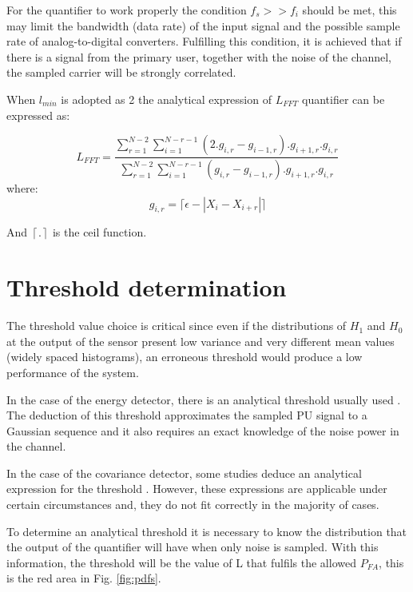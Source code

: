 \documentclass[lettersize,journal]{IEEEtran}
\begin{document}
For the quantifier to work properly the condition $f_s>>f_i$ should be met, this may limit the bandwidth (data rate) of the input signal and the possible sample rate of analog-to-digital converters. Fulfilling this condition, it is achieved that if there is a signal from the primary user, together with the noise of the channel, the sampled carrier will be strongly correlated.

When $l_{min}$ is adopted as 2 the analytical expression of $L_{FFT}$ quantifier can be expressed as:

\begin{equation}
    \label{expresion_L}
    L_{FFT}=\frac{
\sum_{r=1} ^{N-2} \sum_{i=1} ^{N-r-1}  (2.g_{i,r}-g_{i-1,r}).g_{i+1,r}.g_{i,r}}{
\sum_{r=1} ^{N-2} \sum_{i=1} ^{N-r-1}  (g_{i,r}-g_{i-1,r}).g_{i+1,r}.g_{i,r}}
\end{equation}
where:
\begin{equation}
    \label{expresion_g}
    g_{i,r}=\lceil \epsilon- | X_{i}-X_{i+r}| \rceil
\end{equation}

And $\left\lceil . \right\rceil$ is the ceil function.

\section{Threshold determination}\label{umbral}
The threshold value choice is critical since even if the distributions of $H_1$ and $H_0$ at the output of the sensor present low variance and very different mean values (widely spaced histograms), an erroneous threshold would produce a low performance of the system.

In the case of the energy detector, there is an analytical threshold usually used \cite{Yadav2016}. The deduction of this threshold approximates the sampled PU signal to a Gaussian sequence and it also requires an exact knowledge of the noise power in the channel.

In the case of the covariance detector, some studies deduce an analytical expression for the threshold \cite{Jin2012,Zeng2008}. However, these expressions are applicable under certain circumstances and, they do not fit correctly in the majority of cases.

To determine an analytical threshold it is necessary to know the distribution that the output of the quantifier will have when only noise is sampled. With this information, the threshold will be the value of L that fulfils the allowed $P_{FA}$, this is the red area in Fig. \ref{fig:pdfs}.   
\end{document}
